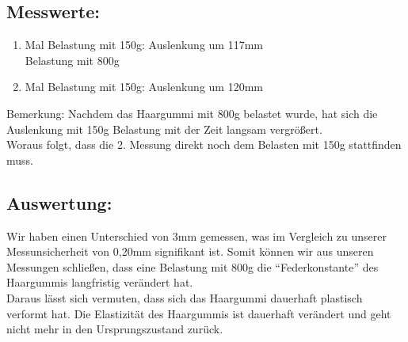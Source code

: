 \documentclass[11pt]{article}
\providecommand{\tightlist}{%
      \setlength{\itemsep}{0pt}\setlength{\parskip}{0pt}}
\begin{document}
    \subsection{Messwerte:}\label{messwerte}
    \begin{enumerate}
    \def\labelenumi{\arabic{enumi}.}
    \tightlist
    \item
      Mal Belastung mit 150g: Auslenkung um 117mm\\
      Belastung mit 800g
    \item
      Mal Belastung mit 150g: Auslenkung um 120mm
    \end{enumerate}
    Bemerkung:
    Nachdem das Haargummi mit 800g belastet wurde, hat sich die Auslenkung
    mit 150g Belastung mit der Zeit langsam vergrößert.\\
    Woraus folgt, dass die 2. Messung direkt noch dem Belasten mit 150g
    stattfinden muss.

    \subsection{Auswertung:}\label{auswertung}
    Wir haben einen Unterschied von 3mm gemessen, was im Vergleich zu
    unserer Messunsicherheit von 0,20mm signifikant ist. Somit können wir
    aus unseren Messungen schließen, dass eine Belastung mit 800g die
    ``Federkonstante'' des Haargummis langfristig verändert hat.\\
    Daraus lässt sich vermuten, dass sich das Haargummi dauerhaft plastisch
    verformt hat. Die Elastizität des Haargummis ist dauerhaft verändert und
    geht nicht mehr in den Ursprungszustand zurück.
  
\end{document}
